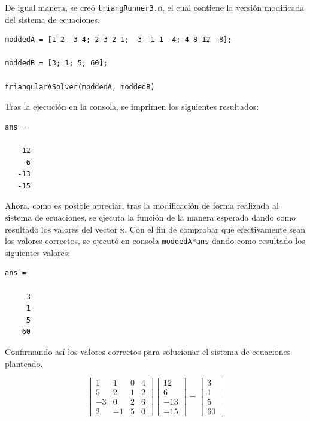 \documentclass[english,notitlepage,letterpaper, 10pt]{article} %
\begin{document}
\begin{enumerate}
\begin{enumerate}
          De igual manera, se creó \texttt{triangRunner3.m}, el cual contiene la versión modificada del sistema de ecuaciones.

          \begin{lstlisting}
moddedA = [1 2 -3 4; 2 3 2 1; -3 -1 1 -4; 4 8 12 -8];

moddedB = [3; 1; 5; 60];

triangularASolver(moddedA, moddedB)
          \end{lstlisting}

          Tras la ejecución en la consola, se imprimen los siguientes resultados:

          \begin{lstlisting}
ans =

    12
     6
   -13
   -15
          \end{lstlisting}

          Ahora, como es posible apreciar, tras la modificación de forma realizada al sistema de ecuaciones, se ejecuta la función de la manera esperada dando como resultado los valores del vector x. Con el fin de comprobar que efectivamente sean los valores correctos, se ejecutó en consola \texttt{moddedA*ans} dando como resultado los siguientes valores:

          \begin{lstlisting}
ans =

     3
     1
     5
    60

          \end{lstlisting}

          Confirmando así los valores correctos para solucionar el sistema de ecuaciones planteado.

          \begin{displaymath}
            \begin{bmatrix}
              1 & 1 & 0 & 4 \\
              5 & 2 & 1 & 2 \\
              -3 & 0 & 2 & 6 \\
              2 & -1 & 5 & 0 
            \end{bmatrix}
            \begin{bmatrix}
              12 \\
              6 \\
              -13 \\
              -15 
            \end{bmatrix}
            =
            \begin{bmatrix}
              3 \\
              1 \\
              5 \\
              60 
            \end{bmatrix}
          \end{displaymath}


\end{enumerate}
\end{enumerate}
\end{document}
